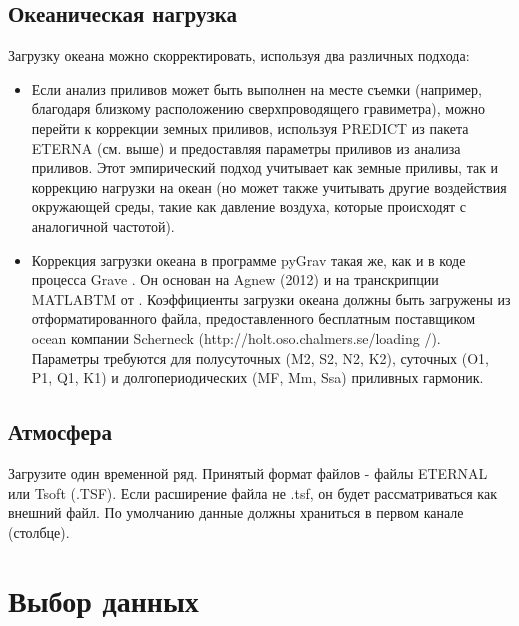 \subsection[Океаническая нагрузка]{Океаническая нагрузка}
\label{subsec:ocean_loading}

Загрузку океана можно скорректировать, используя два различных подхода:
\begin{itemize}
    \item Если анализ приливов может быть выполнен на месте съемки (например,
    благодаря близкому расположению сверхпроводящего гравиметра), можно перейти
    к коррекции земных приливов, используя PREDICT из пакета ETERNA (см. выше) и
    предоставляя параметры приливов из анализа приливов. Этот эмпирический
    подход учитывает как земные приливы, так и коррекцию нагрузки на океан (но
    может также учитывать другие воздействия окружающей среды, такие как
    давление воздуха, которые происходят с аналогичной частотой).
    
    \item Коррекция загрузки океана в программе pyGrav такая же, как и в коде
    процесса Grave \cite{cattin_gravprocess_2015}. Он основан на Agnew (2012) и на
    транскрипции MATLABTM от \cite{cattin_gravprocess_2015}. Коэффициенты загрузки океана
    должны быть загружены из отформатированного файла, предоставленного
    бесплатным поставщиком ocean компании Scherneck
    (http://holt.oso.chalmers.se/loading /). Параметры требуются для
    полусуточных (M2, S2, N2, K2), суточных (O1, P1, Q1, K1) и
    долгопериодических (MF, Mm, Ssa) приливных гармоник.
\end{itemize}

\subsection[Атмосфера]{Атмосфера}
\label{subsec:atmosphere}

Загрузите один временной ряд. Принятый формат файлов - файлы ETERNAL или Tsoft
(.TSF). Если расширение файла не .tsf, он будет рассматриваться как внешний
файл. По умолчанию данные должны храниться в первом канале (столбце).

\section[Выбор данных]{Выбор данных}
\label{sec:data_selection}

